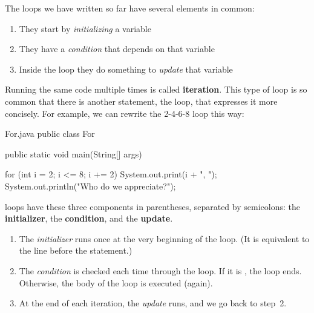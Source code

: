 The loops we have written so far have several elements in common:
\begin{enumerate}
\item They start by \textit{initializing} a variable
\item They have a \textit{condition} that depends on that variable
\item Inside the loop they do something to \textit{update} that variable
\end{enumerate}


Running the same code multiple times is called {\bf iteration}.
This type of loop is so common that there is another statement, the  loop, that expresses it more concisely.
For example, we can rewrite the 2-4-6-8 loop this way:

\begin{trinket} [210] {For.java}
public class For {

    public static void main(String[] args) {
       
       for (int i = 2; i <= 8; i += 2) {
          System.out.print(i + ", ");
       }
       System.out.println("Who do we appreciate?");
    }
}
\end{trinket}

 loops have these three components in parentheses, separated by semicolons: the \textbf{initializer}, the \textbf{condition}, and the \textbf{update}.

\begin{enumerate}

\item The {\em initializer} runs once at the very beginning of the loop.
(It is equivalent to the line before the  statement.)

\item The {\em condition} is checked each time through the loop.
If it is , the loop ends.
Otherwise, the body of the loop is executed (again).

\item At the end of each iteration, the {\em update} runs, and we go back to step~2.

\end{enumerate}

